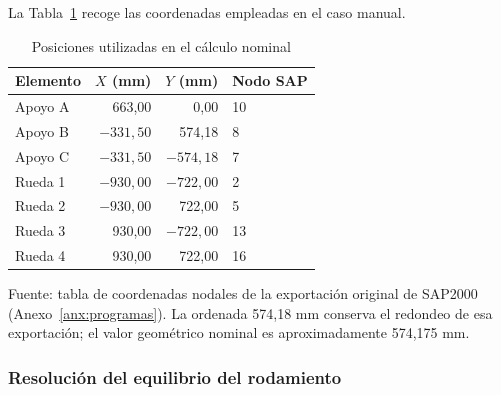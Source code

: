 La Tabla~\ref{tab:coordenadas_manual_revision} recoge las coordenadas empleadas en el caso manual.

\begin{table}[htbp]
\centering\small\singlespacing
\caption{Posiciones utilizadas en el cálculo nominal}
\label{tab:coordenadas_manual_revision}
\begin{tabular}{lrrl}
\toprule
\textbf{Elemento} & \textbf{$X$ (mm)} & \textbf{$Y$ (mm)} & \textbf{Nodo SAP}\\
\midrule
Apoyo A & 663,00 & 0,00 & 10\\
Apoyo B & $-331,50$ & 574,18 & 8\\
Apoyo C & $-331,50$ & $-574,18$ & 7\\
Rueda 1 & $-930,00$ & $-722,00$ & 2\\
Rueda 2 & $-930,00$ & 722,00 & 5\\
Rueda 3 & 930,00 & $-722,00$ & 13\\
Rueda 4 & 930,00 & 722,00 & 16\\
\bottomrule
\end{tabular}
\par\smallskip\footnotesize
Fuente: tabla de coordenadas nodales de la exportación original de SAP2000 (Anexo~\ref{anx:programas}). La ordenada 574,18 mm conserva el redondeo de esa exportación; el valor geométrico nominal es aproximadamente 574,175 mm.
\end{table}

\subsubsection{Resolución del equilibrio del rodamiento}

